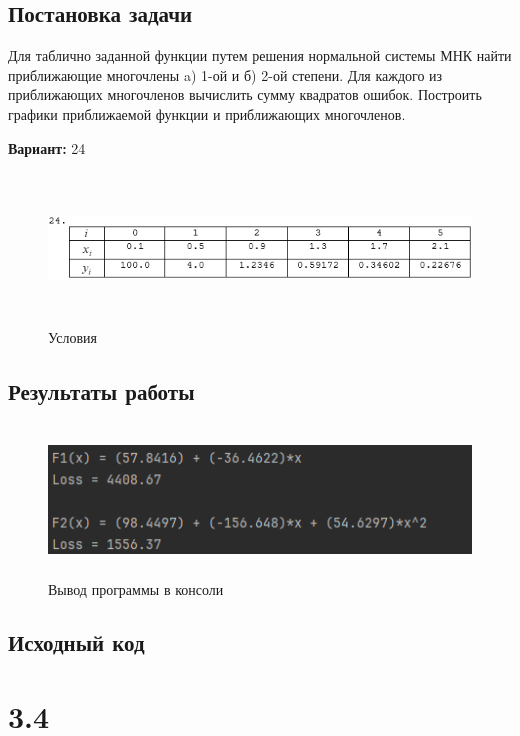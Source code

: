 \subsection{Постановка задачи}
Для таблично заданной функции путем решения нормальной системы МНК найти приближающие многочлены a) 1-ой  и б) 2-ой степени. Для каждого из приближающих многочленов вычислить сумму квадратов ошибок. Построить графики приближаемой функции и приближающих многочленов.

{\bfseries Вариант:} 24
\begin{figure}[h!]
\centering
\includegraphics[width=15cm, height=4cm]{img/task3_3.png}
\caption{Условия}
\end{figure}

\subsection{Результаты работы}
\begin{figure}[h!]
\centering
\includegraphics[width=15cm, height=4cm]{img/lab3_3_res.png}
\caption{Вывод программы в консоли}
\end{figure}
\pagebreak

\subsection{Исходный код}




\pagebreak
\section* {3.4}

